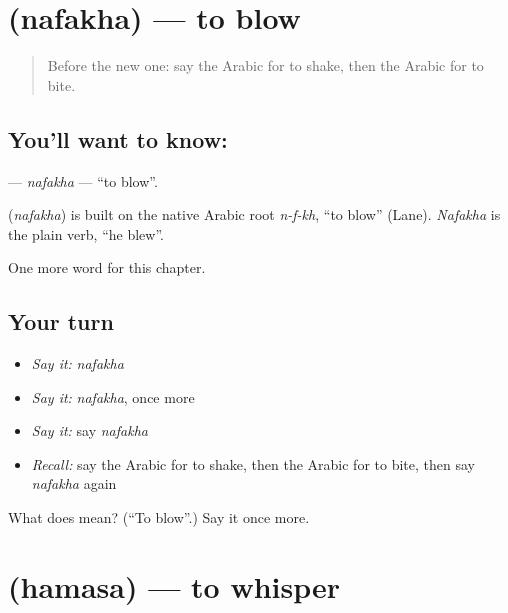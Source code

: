 \section[\texorpdfstring{\ar{نفخ} (nafakha)}{نفخ (nafakha)}]{ (nafakha) — to blow}

\label{lesson:AR-C199-nafakha}



\begin{quote}
Before the new one: say the Arabic for to shake, then the Arabic for to bite.
\end{quote}

\subsection*{You'll want to know: }
\textbf{} — \emph{nafakha} — \textquotedblleft{}to blow\textquotedblright{}.

\begin{cousinweb}
\textbf{} (\emph{nafakha}) is built on the native Arabic root \emph{n-f-kh}, \textquotedblleft{}to blow\textquotedblright{} (Lane). \emph{Nafakha} is the plain verb, \textquotedblleft{}he blew\textquotedblright{}.
\end{cousinweb}

\begin{grammarlens}[title={What you've built}]
One more word for this chapter.
\end{grammarlens}

\subsection*{Your turn}
\begin{itemize}
\raggedright
  \item \emph{Say it:} \emph{nafakha}
  \item \emph{Say it:} \emph{nafakha}, once more
  \item \emph{Say it:} say \emph{nafakha}
  \item \emph{Recall:} say the Arabic for to shake, then the Arabic for to bite, then say \emph{nafakha} again
\end{itemize}

\begin{tcolorbox}[breakable,colback=teal!4,colframe=teal!35!black,title={Before you move on}]
What does  mean? (\textquotedblleft{}To blow\textquotedblright{}.) Say it once more.
\end{tcolorbox}
\section[\texorpdfstring{\ar{همس} (hamasa)}{همس (hamasa)}]{ (hamasa) — to whisper}

